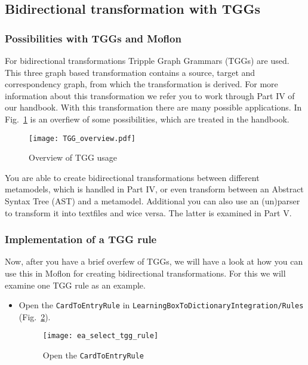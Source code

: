 \subsection{Bidirectional transformation with TGGs}

\subsubsection{Possibilities with TGGs and Moflon}
\label{TGG_overview_chapter}
For bidirectional transformations Tripple Graph Grammars (TGGs) are used. This three graph based transformation contains a source, target and correspondency graph, from which the transformation is derived. For more information about this transformation we refer you to work through Part IV of our handbook.
\newline
With this transformation there are many possible applications. In Fig.~\ref{Tgg_overview} is an overfiew of some possibilities, which are treated in the handbook.

\begin{figure}[htbp]
	\centering
  \texttt{[image: TGG\_overview.pdf]}
	\caption{Overview of TGG usage} 
	\label{Tgg_overview} 
\end{figure}


You are able to create bidirectional transformations between different metamodels, which is handled in Part IV, or even transform between an Abstract Syntax Tree (AST) and a metamodel. Additional you can also use an (un)parser to transform it into textfiles and wice versa. The latter is examined in Part V.


\subsubsection{Implementation of a TGG rule}
Now, after you have a brief overfew of TGGs, we will have a look at how you can use this in Moflon for creating bidirectional transformations. For this we will examine one TGG rule as an example.

\begin{itemize}

\item Open the \texttt{CardToEntryRule} in \texttt{Learning\-Box\-To\-Dictionary\-Integra\-tion/\-Rules} (Fig.~\ref{ea:openTGG_rule}).

\begin{figure}[htbp]
	\centering
  \texttt{[image: ea\_select\_tgg\_rule]}
	\caption{Open the \texttt{CardToEntryRule}} 
	\label{ea:openTGG_rule} 
\end{figure}

\end{itemize}

